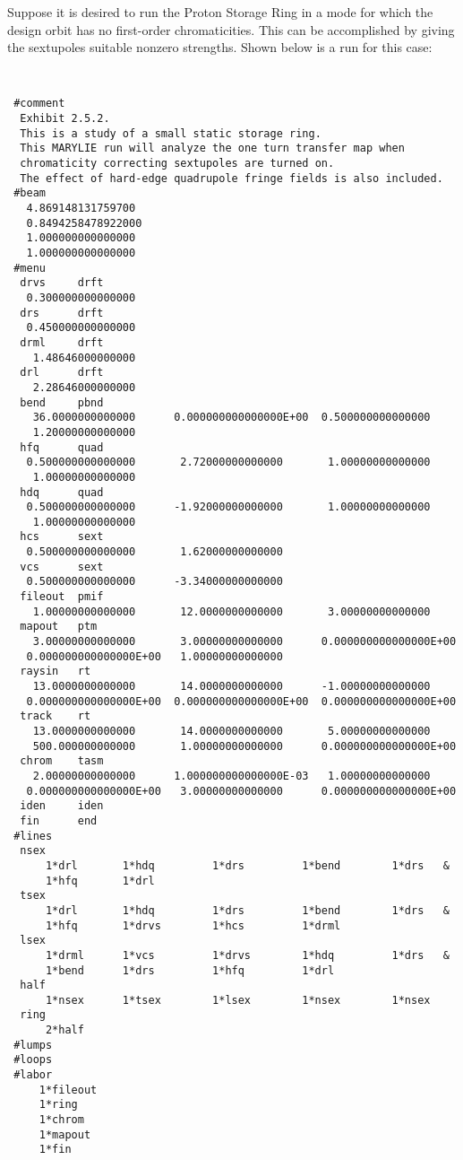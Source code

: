      Suppose it is desired to run the Proton Storage Ring in a mode for
which the design orbit has no first-order chromaticities.  This can be
accomplished by giving the sextupoles suitable nonzero strengths.  Shown
below is a \Mary run for this case:

{
\footnotesize\tt
\begin{verbatim}
 #comment
  Exhibit 2.5.2.
  This is a study of a small static storage ring.
  This MARYLIE run will analyze the one turn transfer map when
  chromaticity correcting sextupoles are turned on.
  The effect of hard-edge quadrupole fringe fields is also included.
 #beam
   4.869148131759700
   0.8494258478922000
   1.000000000000000
   1.000000000000000
 #menu
  drvs     drft
   0.300000000000000
  drs      drft
   0.450000000000000
  drml     drft
    1.48646000000000
  drl      drft
    2.28646000000000
  bend     pbnd
    36.0000000000000      0.000000000000000E+00  0.500000000000000
    1.20000000000000
  hfq      quad
   0.500000000000000       2.72000000000000       1.00000000000000
    1.00000000000000
  hdq      quad
   0.500000000000000      -1.92000000000000       1.00000000000000
    1.00000000000000
  hcs      sext
   0.500000000000000       1.62000000000000
  vcs      sext
   0.500000000000000      -3.34000000000000
  fileout  pmif
    1.00000000000000       12.0000000000000       3.00000000000000
  mapout   ptm
    3.00000000000000       3.00000000000000      0.000000000000000E+00
   0.000000000000000E+00   1.00000000000000
  raysin   rt
    13.0000000000000       14.0000000000000      -1.00000000000000
   0.000000000000000E+00  0.000000000000000E+00  0.000000000000000E+00
  track    rt
    13.0000000000000       14.0000000000000       5.00000000000000
    500.000000000000       1.00000000000000      0.000000000000000E+00
  chrom    tasm
    2.00000000000000      1.000000000000000E-03   1.00000000000000
   0.000000000000000E+00   3.00000000000000      0.000000000000000E+00
  iden     iden
  fin      end
 #lines
  nsex
      1*drl       1*hdq         1*drs         1*bend        1*drs   &
      1*hfq       1*drl
  tsex
      1*drl       1*hdq         1*drs         1*bend        1*drs   &
      1*hfq       1*drvs        1*hcs         1*drml
  lsex
      1*drml      1*vcs         1*drvs        1*hdq         1*drs   &
      1*bend      1*drs         1*hfq         1*drl
  half
      1*nsex      1*tsex        1*lsex        1*nsex        1*nsex
  ring
      2*half
 #lumps
 #loops
 #labor
     1*fileout
     1*ring
     1*chrom
     1*mapout
     1*fin


\end{verbatim}}
